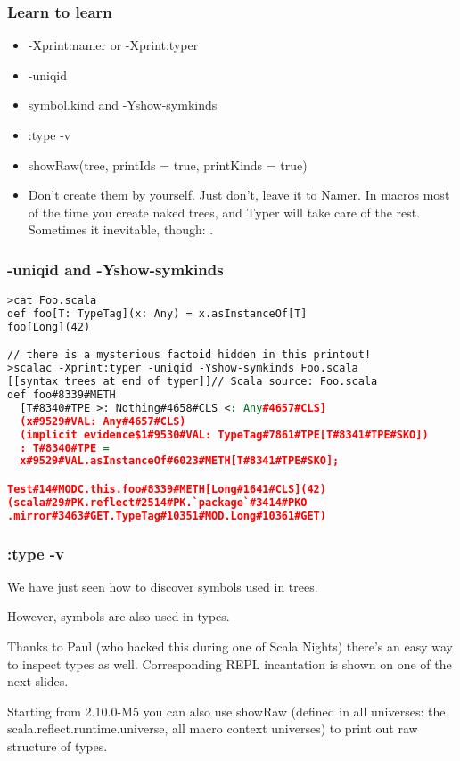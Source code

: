 \documentclass[hyperref={bookmarks=false}]{beamer}
\begin{document}
\begin{frame}[fragile]
\frametitle{Learn to learn}

\begin{itemize}
\item -Xprint:namer or -Xprint:typer
\item -uniqid
\item symbol.kind and -Yshow-symkinds
\item :type -v
\item showRaw(tree, printIds = true, printKinds = true)
\item Don't create them by yourself. Just don't, leave it to Namer. In macros most of the time you create naked trees, and Typer will take care of the rest. Sometimes it inevitable, though: .
\end{itemize}

\end{frame}

\begin{frame}[fragile]
\frametitle{-uniqid and -Yshow-symkinds}

\begin{lstlisting}[language=XML]
>cat Foo.scala
def foo[T: TypeTag](x: Any) = x.asInstanceOf[T]
foo[Long](42)

// there is a mysterious factoid hidden in this printout!
>scalac -Xprint:typer -uniqid -Yshow-symkinds Foo.scala
[[syntax trees at end of typer]]// Scala source: Foo.scala
def foo#8339#METH
  [T#8340#TPE >: Nothing#4658#CLS <: Any#4657#CLS]
  (x#9529#VAL: Any#4657#CLS)
  (implicit evidence$1#9530#VAL: TypeTag#7861#TPE[T#8341#TPE#SKO])
  : T#8340#TPE =
  x#9529#VAL.asInstanceOf#6023#METH[T#8341#TPE#SKO];

Test#14#MODC.this.foo#8339#METH[Long#1641#CLS](42)
(scala#29#PK.reflect#2514#PK.`package`#3414#PKO
.mirror#3463#GET.TypeTag#10351#MOD.Long#10361#GET)
\end{lstlisting}

\end{frame}

\begin{frame}[fragile]
\frametitle{:type -v}

We have just seen how to discover symbols used in trees.

However, symbols are also used in types.

Thanks to Paul (who hacked this during one of Scala Nights)
there's an easy way to inspect types as well.
Corresponding REPL incantation is shown on one of the next slides.

Starting from 2.10.0-M5 you can also use showRaw (defined in all universes:
the scala.reflect.runtime.universe, all macro context universes)
to print out raw structure of types.

\end{frame}
\end{document}
